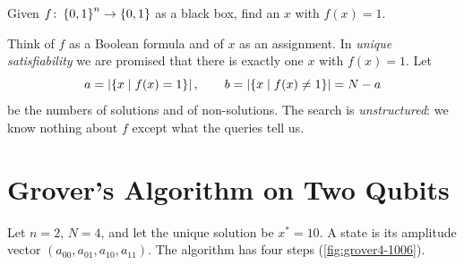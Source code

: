 
\begin{problem}
    Given $f \colon \left\lbrace0,1\right\rbrace^n \to \left\lbrace0,1\right\rbrace$ as a black box, find an $x$ with $f(x) = 1$.
\end{problem}

Think of $f$ as a Boolean formula and of $x$ as an assignment. In \emph{unique satisfiability} we are
promised that there is exactly one $x$ with $f(x) = 1$. Let
\[a = \left\lvert\left\lbrace x \mid f(x) = 1\right\rbrace\right\rvert, \qquad b = \left\lvert\left\lbrace x \mid f(x) \neq 1\right\rbrace\right\rvert = N - a\]
be the numbers of solutions and of non-solutions. The search is \emph{unstructured}: we know nothing
about $f$ except what the queries tell us.

\section{Grover's Algorithm on Two Qubits}

Let $n = 2$, $N = 4$, and let the unique solution be $x^* = 10$. A state is its amplitude vector
$(a_{00}, a_{01}, a_{10}, a_{11})$. The algorithm has four steps (\cref{fig:grover4-1006}).

